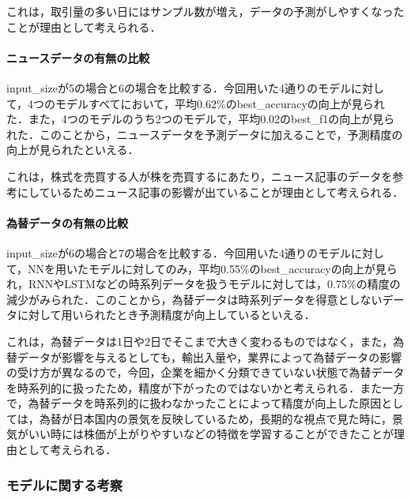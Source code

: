 \documentclass[a4paper,11pt]{ltjsarticle}
\begin{document}
これは，取引量の多い日にはサンプル数が増え，データの予測がしやすくなったことが理由として考えられる．
\paragraph{ニュースデータの有無の比較}
input\_sizeが5の場合と6の場合を比較する．今回用いた4通りのモデルに対して，4つのモデルすべてにおいて，平均0.62\%のbest\_accuracyの向上が見られた．また，4つのモデルのうち2つのモデルで，平均0.02のbest\_f1の向上が見られた．このことから，ニュースデータを予測データに加えることで，予測精度の向上が見られたといえる．

これは，株式を売買する人が株を売買するにあたり，ニュース記事のデータを参考にしているためニュース記事の影響が出ていることが理由として考えられる．

\paragraph{為替データの有無の比較}
input\_sizeが6の場合と7の場合を比較する．今回用いた4通りのモデルに対して，NNを用いたモデルに対してのみ，平均0.55\%のbest\_accuracyの向上が見られ，RNNやLSTMなどの時系列データを扱うモデルに対しては，0.75\%の精度の減少がみられた．このことから，為替データは時系列データを得意としないデータに対して用いられたとき予測精度が向上しているといえる．

これは，為替データは1日や2日でそこまで大きく変わるものではなく，また，為替データが影響を与えるとしても，輸出入量や，業界によって為替データの影響の受け方が異なるので，今回，企業を細かく分類できていない状態で為替データを時系列的に扱ったため，精度が下がったのではないかと考えられる．また一方で，為替データを時系列的に扱わなかったことによって精度が向上した原因としては，為替が日本国内の景気を反映しているため，長期的な視点で見た時に，景気がいい時には株価が上がりやすいなどの特徴を学習することができたことが理由として考えられる．

\subsubsection{モデルに関する考察}
\end{document}
